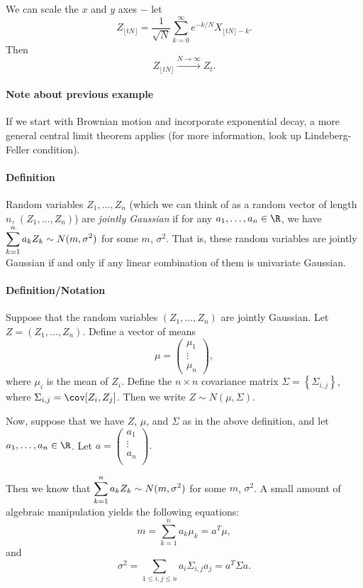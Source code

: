 We can scale the $x$ and $y$ axes $-$ let \[Z_{\lfloor tN\rfloor}=\frac{1}{\sqrt{N}}\sum_{k=0}^\infty e^{-k/N}X_{\lfloor tN\rfloor-k}.\]  Then \[Z_{\lfloor tN\rfloor}\xrightarrow{N\to\infty}Z_t.\]


\paragraph{Note about previous example} If we start with Brownian motion and incorporate exponential decay, a more general central limit theorem applies (for more information, look up Lindeberg-Feller condition).

\paragraph{Definition} Random variables $Z_1,\dots,Z_n$ (which we can think of as a random vector of length $n$, $(Z_1,\dots,Z_n)$) are \emph{jointly Gaussian} if for any $a_1,\dots,a_n\in\R$, we have $\displaystyle\sum_{k=1}^n a_kZ_k\sim N(m,\sigma^2)$ for some $m$, $\sigma^2$.  That is, these random variables are jointly Gaussian if and only if any linear combination of them is univariate Gaussian.

\paragraph{Definition/Notation} Suppose that the random variables $(Z_1,\dots,Z_n)$ are jointly Gaussian.  Let $Z=(Z_1,\dots,Z_n)$.  Define a vector of means \[\mu=\left(\begin{array}{ccc}
\mu_1 \\ \vdots \\ \mu_n
\end{array}\right),\] where $\mu_i$ is the mean of $Z_i$.  Define the $n\times n$ covariance matrix $\Sigma=\left\{\Sigma_{i,j}\right\}$, where $\Sigma_{i,j}=\cov[Z_i,Z_j]$.  Then we write $Z\sim N(\mu, \Sigma)$.

Now, suppose that we have $Z$, $\mu$, and $\Sigma$ as in the above definition, and let $a_1,\dots,a_n\in\R$.  Let $a=\left(\begin{array}{c}
a_1\\ \vdots\\ a_n\\
\end{array}\right).$ 

Then we know that $\displaystyle\sum_{k=1}^n a_kZ_k\sim N(m,\sigma^2)$ for some $m$, $\sigma^2$.  A small amount of algebraic manipulation yields the following equations:
\[m=\sum_{k=1}^n a_k\mu_k=a^T\mu,\] and \[\sigma^2=\sum_{1\leq i,j\leq n} a_i\Sigma_{i,j}a_j=a^T\Sigma a.\]

